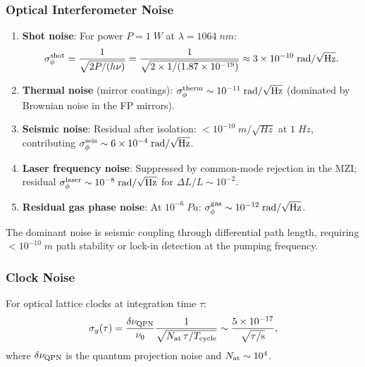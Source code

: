\documentclass[aps,prd,twocolumn,superscriptaddress,nofootinbib]{revtex4-2}
\begin{document}
\subsubsection{Optical Interferometer Noise}

\begin{enumerate}
\item \textbf{Shot noise}: For power $P = 1\;\si{W}$ at
$\lambda = 1064\;\si{nm}$:
\begin{equation}
\sigma_\phi^{\rm shot} = \frac{1}{\sqrt{2P/(h\nu)}}
= \frac{1}{\sqrt{2 \times 1/(1.87 \times 10^{-19})}}
\approx 3 \times 10^{-10}\;\si{rad/\sqrt{Hz}}.
\end{equation}

\item \textbf{Thermal noise} (mirror coatings):
$\sigma_\phi^{\rm therm} \sim 10^{-11}\;\si{rad/\sqrt{Hz}}$
(dominated by Brownian noise in the FP mirrors).

\item \textbf{Seismic noise}: Residual after isolation:
$< 10^{-10}\;\si{m/\sqrt{Hz}}$ at $1\;\si{Hz}$, contributing
$\sigma_\phi^{\rm seis} \sim 6 \times 10^{-4}\;\si{rad/\sqrt{Hz}}$.

\item \textbf{Laser frequency noise}: Suppressed by common-mode
rejection in the MZI; residual
$\sigma_\phi^{\rm laser} \sim 10^{-8}\;\si{rad/\sqrt{Hz}}$
for $\Delta L/L \sim 10^{-2}$.

\item \textbf{Residual gas phase noise}: At $10^{-6}\;\si{Pa}$:
$\sigma_\phi^{\rm gas} \sim 10^{-12}\;\si{rad/\sqrt{Hz}}$.
\end{enumerate}

The dominant noise is seismic coupling through differential path
length, requiring $< 10^{-10}\;\si{m}$ path stability or lock-in
detection at the pumping frequency.

\subsubsection{Clock Noise}

For optical lattice clocks at integration time $\tau$:
\begin{equation}
\sigma_y(\tau) = \frac{\delta\nu_{\rm QPN}}{\nu_0}
\frac{1}{\sqrt{N_{\rm at}\,\tau/T_{\rm cycle}}}
\sim \frac{5 \times 10^{-17}}{\sqrt{\tau/\si{s}}},
\end{equation}
where $\delta\nu_{\rm QPN}$ is the quantum projection noise
and $N_{\rm at} \sim 10^4$.
\end{document}
